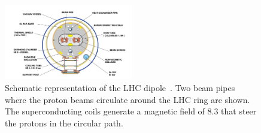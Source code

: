  \begin{figure}[ht]
	\centering
	\includegraphics[width=0.5\textwidth]{2_ExperimentalSetup/Figures/lhc-pho-1998-341}
	\caption{Schematic representation of the LHC dipole~\cite{Jean-Luc:841539}. Two beam pipes where the proton beams circulate around the LHC ring are shown. The superconducting coils generate a magnetic field of 8.3 \tesla that steer the protons in the circular path. }
	\label{fig:dipole}
\end{figure}





